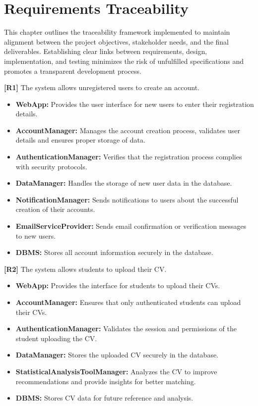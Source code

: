\chapter{Requirements Traceability}

This chapter outlines the traceability framework implemented to maintain alignment between the project objectives, stakeholder needs, and the final deliverables. Establishing clear links between requirements, design, implementation, and testing minimizes the risk of unfulfilled specifications and promotes a transparent development process.

\textbf{[R1]} The system allows unregistered users to create an account.  
\begin{itemize}
    \item \textbf{WebApp:} Provides the user interface for new users to enter their registration details.
    \item \textbf{AccountManager:} Manages the account creation process, validates user details and ensures proper storage of data.
    \item \textbf{AuthenticationManager:} Verifies that the registration process complies with security protocols.
    \item \textbf{DataManager:} Handles the storage of new user data in the database.
    \item \textbf{NotificationManager:} Sends notifications to users about the successful creation of their accounts.
    \item \textbf{EmailServiceProvider:} Sends email confirmation or verification messages to new users.
    \item \textbf{DBMS:} Stores all account information securely in the database.
\end{itemize}

\textbf{[R2]} The system allows students to upload their CV.  
\begin{itemize}
    \item \textbf{WebApp:} Provides the interface for students to upload their CVs.
    \item \textbf{AccountManager:} Ensures that only authenticated students can upload their CVs.
    \item \textbf{AuthenticationManager:} Validates the session and permissions of the student uploading the CV.
    \item \textbf{DataManager:} Stores the uploaded CV securely in the database.
    \item \textbf{StatisticalAnalysisToolManager:} Analyzes the CV to improve recommendations and provide insights for better matching.
    \item \textbf{DBMS:} Stores CV data for future reference and analysis.
\end{itemize}

